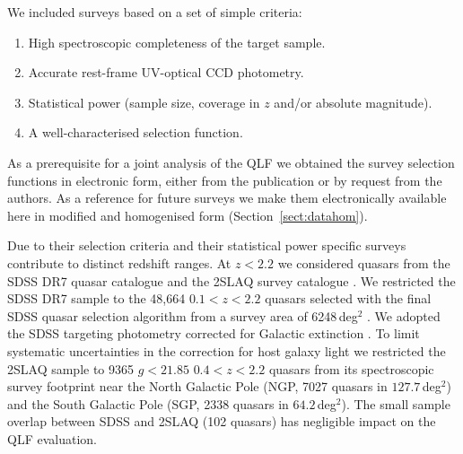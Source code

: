 \documentclass[fleqn,usenatbib]{mnras}
\begin{document}
We included surveys based on a set of simple criteria:
\begin{enumerate}
\item High spectroscopic completeness of the target sample.
\item Accurate rest-frame UV-optical CCD photometry.
\item Statistical power (sample size, coverage in $z$ and/or absolute magnitude).
\item A well-characterised selection function.
\end{enumerate}
As a prerequisite for a joint analysis of the QLF we obtained the
survey selection functions in electronic form, either from the
publication or by request from the authors. As a reference for future surveys we
make them electronically available here
in modified and homogenised form
(Section~\ref{sect:datahom}).

Due to their selection criteria and their statistical power specific
surveys contribute to distinct redshift ranges. At $z<2.2$ we
considered quasars from the SDSS DR7 quasar catalogue
\citep{2010AJ....139.2360S} and the 2SLAQ survey catalogue
\citep{2009MNRAS.392...19C}. We restricted the SDSS DR7 sample to the
48,664 $0.1<z<2.2$ quasars selected with the final SDSS quasar
selection algorithm \citep{2002AJ....123.2945R, 2006AJ....131.2766R}
from a survey area of 6248\,deg$^2$ \citep{2012ApJ...746..169S}. We
adopted the SDSS targeting photometry corrected for Galactic
extinction \citep{2010AJ....139.2360S}. To limit systematic
uncertainties in the correction for host galaxy light
\citep[detailed in][]{2009MNRAS.392...19C} we restricted the 2SLAQ sample to 9365
$g<21.85$ $0.4<z<2.2$ quasars from its spectroscopic survey footprint
near the North Galactic Pole (NGP, 7027 quasars in $127.7$\,deg$^2$)
and the South Galactic Pole (SGP, 2338 quasars in
$64.2$\,deg$^2$). The small sample overlap between SDSS and 2SLAQ (102
quasars) has negligible impact on the QLF evaluation.
\end{document}
